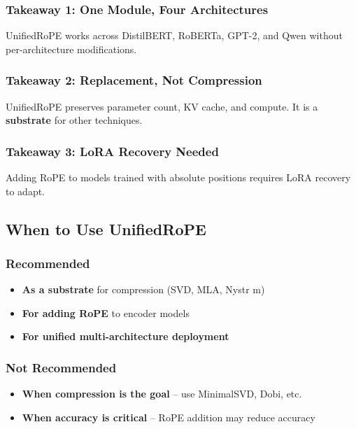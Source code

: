 {\subsubsection{Takeaway 1: One Module, Four Architectures}

UnifiedRoPE works across DistilBERT, RoBERTa, GPT-2, and Qwen without 
per-architecture modifications.

\subsubsection{Takeaway 2: Replacement, Not Compression}

UnifiedRoPE preserves parameter count, KV cache, and compute. It is a 
\textbf{substrate} for other techniques.

\subsubsection{Takeaway 3: LoRA Recovery Needed}

Adding RoPE to models trained with absolute positions requires LoRA 
recovery to adapt.

\subsection{When to Use UnifiedRoPE}

\subsubsection{Recommended}

\begin{itemize}
\item \textbf{As a substrate} for compression (SVD, MLA, Nystr m)
\item \textbf{For adding RoPE} to encoder models
\item \textbf{For unified multi-architecture deployment}

\end{itemize}
\subsubsection{Not Recommended}

\begin{itemize}
\item \textbf{When compression is the goal} -- use MinimalSVD, Dobi, etc.
\item \textbf{When accuracy is critical} -- RoPE addition may reduce accuracy


\end{itemize}}

